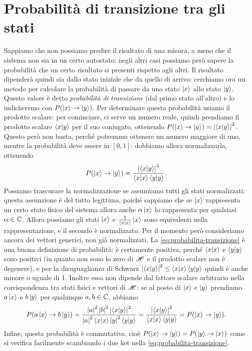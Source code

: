 \section{Probabilità di transizione tra gli stati}
Sappiamo che non possiamo predire il risultato di una misura, a meno che il sistema non sia in un certo autostato: negli altri casi possiamo però sapere la probabilità che un certo risultato si presenti rispetto agli altri.
Il risultato dipenderà quindi sia dallo stato iniziale che da quello di arrivo: cerchiamo ora un metodo per calcolare la probabilità di passare da uno stato $\left|{x}\right\rangle$ allo stato $\left|{y}\right\rangle$.
Questo valore è detto \emph{probabilità di transizione} (dal primo stato all'altro) e lo indicheremo con $P(\left|{x}\right\rangle\to\left|{y}\right\rangle)$.
Per determinare questa probabilità usiamo il prodotto scalare: per cominciare, ci serve un numero reale, quindi prendiamo il prodotto scalare $\left\langle{x}\middle|{y}\right\rangle$ per il suo coniugato, ottenendo $P(\left|{x}\right\rangle\to\left|{y}\right\rangle)=\left|{\left\langle{x}\middle|{y}\right\rangle}\right|^2$.
Questo però non basta, perch\'e potremmo ottenere un numero maggiore di uno, mentre la probabilità deve essere in $[0,1]$: dobbiamo allora normalizzarla, ottenendo
\begin{equation}
	P(\left|{x}\right\rangle\to\left|{y}\right\rangle)=\frac{\left|{\left\langle{x}\middle|{y}\right\rangle}\right|^2}{\left\langle{x}\middle|{x}\right\rangle\left\langle{y}\middle|{y}\right\rangle}.
	\label{eq:probabilita-transizione}
\end{equation}
Possiamo trascurare la normalizzazione se assumiamo tutti gli stati normalizzati: questa assunzione è del tutto legittima, poich\'e sappiamo che se $\left|{x}\right\rangle$ rappresenta un certo stato fisico del sistema allora anche $\alpha\left|{x}\right\rangle$ lo rappresenta per qualsiasi $\alpha\in\mathbb{C}$.
Allora possiamo gli stati $\left|{x}\right\rangle$ e $\frac1{\left\langle{x}\middle|{x}\right\rangle}\left|{x}\right\rangle$ sono equivalenti nella rappresentazione, e il secondo è normalizzato.
Per il momento però consideriamo ancora dei vettori generici, non già normalizzati.
La \eqref{eq:probabilita-transizione} è una buona definizione di probabilità: è certamente positiva, perch\'e $\left\langle{x}\middle|{x}\right\rangle$ e $\left\langle{y}\middle|{y}\right\rangle$ sono positivi (in quanto non sono lo zero di $\mathscr H$ e il prodotto scalare non è degenere), e per la disuguaglianza di Schwarz $\left|{\left\langle{x}\middle|{y}\right\rangle}\right|^2\leq\left\langle{x}\middle|{x}\right\rangle\left\langle{y}\middle|{y}\right\rangle$ quindi è anche minore o uguale di 1.
Inoltre essa non dipende dal fattore scalare arbitrario nella corrispondenza tra stati fisici e vettori di $\mathscr H$: se al posto di $\left|{x}\right\rangle$ e $\left|{y}\right\rangle$ prendiamo $a\left|{x}\right\rangle$ e $b\left|{y}\right\rangle$ per qualunque $a,b\in\mathbb{C}$, abbiamo
\begin{equation}
	P(a\left|{x}\right\rangle\to b\left|{y}\right\rangle)=\frac{\left|{a}\right|^2\left|{b}\right|^2\left|{\left\langle{x}\middle|{y}\right\rangle}\right|^2}{\left|{a}\right|^2\left\langle{x}\middle|{x}\right\rangle\left|{y}\right|^2\left\langle{y}\middle|{y}\right\rangle}=\frac{\left|{\left\langle{x}\middle|{y}\right\rangle}\right|^2}{\left\langle{x}\middle|{x}\right\rangle\left\langle{y}\middle|{y}\right\rangle}=P(\left|{x}\right\rangle\to\left|{y}\right\rangle).
\end{equation}
Infine, questa probabilità è commutativa, cioè $P(\left|{x}\right\rangle\to\left|{y}\right\rangle)=P(\left|{y}\right\rangle\to\left|{x}\right\rangle)$ come si verifica facilmente scambiando i due ket nella \eqref{eq:probabilita-transizione}.

